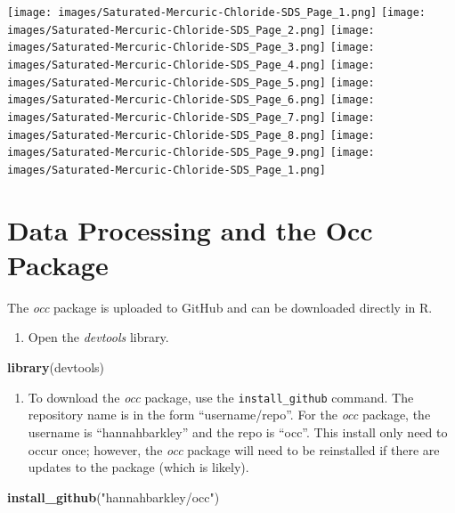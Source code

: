\documentclass[]{book}
\newenvironment{Shaded}{\begin{snugshade}}{\end{snugshade}}
\newcommand{\KeywordTok}[1]{\textcolor[rgb]{0.13,0.29,0.53}{\textbf{#1}}}
\newcommand{\NormalTok}[1]{#1}
\newcommand{\StringTok}[1]{\textcolor[rgb]{0.31,0.60,0.02}{#1}}
\providecommand{\tightlist}{%
  \setlength{\itemsep}{0pt}\setlength{\parskip}{0pt}}
\begin{document}
\texttt{[image: images/Saturated-Mercuric-Chloride-SDS\_Page\_1.png]}
\texttt{[image: images/Saturated-Mercuric-Chloride-SDS\_Page\_2.png]}
\texttt{[image: images/Saturated-Mercuric-Chloride-SDS\_Page\_3.png]}
\texttt{[image: images/Saturated-Mercuric-Chloride-SDS\_Page\_4.png]}
\texttt{[image: images/Saturated-Mercuric-Chloride-SDS\_Page\_5.png]}
\texttt{[image: images/Saturated-Mercuric-Chloride-SDS\_Page\_6.png]}
\texttt{[image: images/Saturated-Mercuric-Chloride-SDS\_Page\_7.png]}
\texttt{[image: images/Saturated-Mercuric-Chloride-SDS\_Page\_8.png]}
\texttt{[image: images/Saturated-Mercuric-Chloride-SDS\_Page\_9.png]}
\texttt{[image: images/Saturated-Mercuric-Chloride-SDS\_Page\_1.png]}

\hypertarget{data_processing}{%
\chapter{Data Processing and the Occ Package}\label{data_processing}}

The \emph{occ} package is uploaded to GitHub and can be downloaded directly in R.

\begin{enumerate}
\def\labelenumi{\arabic{enumi}.}
\tightlist
\item
  Open the \emph{devtools} library.
\end{enumerate}

\begin{Shaded}
\begin{Highlighting}[]
\KeywordTok{library}\NormalTok{(devtools)}
\end{Highlighting}
\end{Shaded}

\begin{enumerate}
\def\labelenumi{\arabic{enumi}.}
\setcounter{enumi}{1}
\tightlist
\item
  To download the \emph{occ} package, use the \texttt{install\_github} command. The repository name is in the form ``username/repo''. For the \emph{occ} package, the username is ``hannahbarkley'' and the repo is ``occ''. This install only need to occur once; however, the \emph{occ} package will need to be reinstalled if there are updates to the package (which is likely).
\end{enumerate}

\begin{Shaded}
\begin{Highlighting}[]
\KeywordTok{install_github}\NormalTok{(}\StringTok{"hannahbarkley/occ"}\NormalTok{)}
\end{Highlighting}
\end{Shaded}
\end{document}
